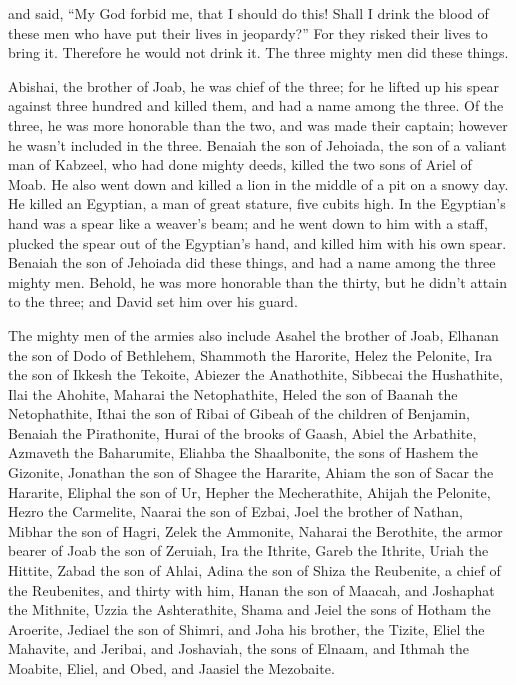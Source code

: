 {and said, “My God forbid me, that I should do this! Shall I drink the blood of these men who have put their lives in jeopardy?” For they risked their lives to bring it. Therefore he would not drink it. The three mighty men did these things.
\par }{\PP {}Abishai, the brother of Joab, he was chief of the three; for he lifted up his spear against three hundred and killed them, and had a name among the three.
Of the three, he was more honorable than the two, and was made their captain; however he wasn’t included in the three.
Benaiah the son of Jehoiada, the son of a valiant man of Kabzeel, who had done mighty deeds, killed the two sons of Ariel of Moab. He also went down and killed a lion in the middle of a pit on a snowy day.
He killed an Egyptian, a man of great stature, five cubits high. In the Egyptian’s hand was a spear like a weaver’s beam; and he went down to him with a staff, plucked the spear out of the Egyptian’s hand, and killed him with his own spear.
Benaiah the son of Jehoiada did these things, and had a name among the three mighty men.
Behold, he was more honorable than the thirty, but he didn’t attain to the three; and David set him over his guard.
\par }{\PP {}The mighty men of the armies also include Asahel the brother of Joab, Elhanan the son of Dodo of Bethlehem,
Shammoth the Harorite, Helez the Pelonite,
Ira the son of Ikkesh the Tekoite, Abiezer the Anathothite,
Sibbecai the Hushathite, Ilai the Ahohite,
Maharai the Netophathite, Heled the son of Baanah the Netophathite,
Ithai the son of Ribai of Gibeah of the children of Benjamin, Benaiah the Pirathonite,
Hurai of the brooks of Gaash, Abiel the Arbathite,
Azmaveth the Baharumite, Eliahba the Shaalbonite,
the sons of Hashem the Gizonite, Jonathan the son of Shagee the Hararite,
Ahiam the son of Sacar the Hararite, Eliphal the son of Ur,
Hepher the Mecherathite, Ahijah the Pelonite,
Hezro the Carmelite, Naarai the son of Ezbai,
Joel the brother of Nathan, Mibhar the son of Hagri,
Zelek the Ammonite, Naharai the Berothite, the armor bearer of Joab the son of Zeruiah,
Ira the Ithrite, Gareb the Ithrite,
Uriah the Hittite, Zabad the son of Ahlai,
Adina the son of Shiza the Reubenite, a chief of the Reubenites, and thirty with him,
Hanan the son of Maacah, and Joshaphat the Mithnite,
Uzzia the Ashterathite, Shama and Jeiel the sons of Hotham the Aroerite,
Jediael the son of Shimri, and Joha his brother, the Tizite,
Eliel the Mahavite, and Jeribai, and Joshaviah, the sons of Elnaam, and Ithmah the Moabite,
Eliel, and Obed, and Jaasiel the Mezobaite.

}
